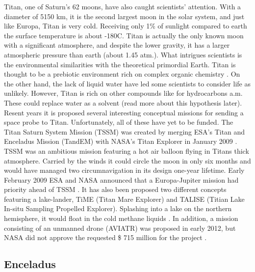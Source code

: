\begin{multicols}{2}
Titan, one of Saturn's 62 moons, have also caught scientists' attention.
With a diameter of 5150 km, it is the second largest moon in the solar system, and just like Europa, Titan is very cold.
Receiving only 1\% of sunlight compared to earth the surface temperature is about -180\degree C.
Titan is actually the only known moon with a significant atmosphere, and despite the lower gravity, it has a larger atmospheric pressure than earth (about 1.45 atm.).
What intrigues scientists is the environmental similarities with the theoretical primordial Earth.
Titan is thought to be a prebiotic environment rich on complex organic chemistry \cite{RichOrganics}. On the other hand, the lack of liquid water have led some scientists to consider life as unlikely.
However, Titan is rich on other compounds like for hydrocarbons a.m.
These could replace water as a solvent (read more about this hypothesis later).
Resent years it is proposed several interesting conceptual missions for sending a space probe to Titan. Unfortunately, all of these have yet to be funded.
The Titan Saturn System Mission (TSSM) was created by merging ESA’s Titan and Enceladus Mission (TandEM) with NASA’s Titan Explorer in January 2009 \cite{FPlan10}.
TSSM was an ambitious mission featuring a hot air balloon flying in Titans thick atmosphere.
Carried by the winds it could circle the moon in only six months and would have managed two circumnavigation in its design one-year lifetime.
Early February 2009 ESA and NASA announced that a Europa-Jupiter mission had priority ahead of TSSM \cite{FPlan07}.
It has also been proposed two different concepts featuring a lake-lander, TiME (Titan Mare Explorer) and TALISE (Titian Lake In-situ Sampling Propelled Explorer).
Splashing into a lake on the northern hemisphere, it would float in the cold methane liquids \cite{TiME} \cite{TALISE}.
In addition, a mission consisting of an unmanned drone (AVIATR) was proposed in early 2012, but NASA did not approve the requested \$ 715 million for the project \cite{AVIATR}.

\subsection*{Enceladus}
 

\end{multicols}
